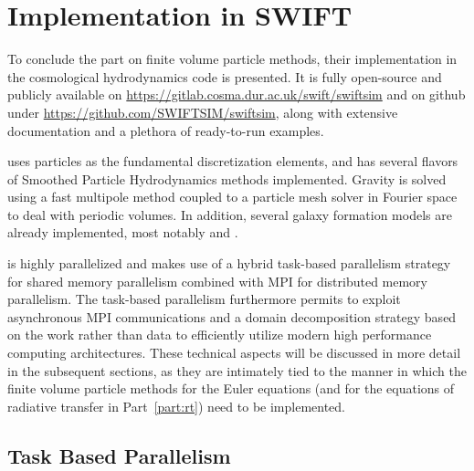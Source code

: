 \chapter{Implementation in SWIFT}\label{chap:meshless-implementation}


To conclude the part on finite volume particle methods, their implementation in the cosmological
hydrodynamics code \swift \citep{schallerSWIFTUsingTaskbased2016,
schallerSWIFTSPHInterdependent2018a} is presented. It is fully open-source and publicly available on \url{https://gitlab.cosma.dur.ac.uk/swift/swiftsim} and on github under
\url{https://github.com/SWIFTSIM/swiftsim}, along with extensive documentation and a plethora of
ready-to-run examples.

\swift uses particles as the fundamental discretization elements, and has several flavors of
Smoothed Particle Hydrodynamics methods implemented. Gravity is solved using a fast multipole method \citep{chengFastAdaptiveMultipole1999, dehnenFastMultipoleMethod2014f} coupled to a particle mesh solver in Fourier space to deal with periodic volumes. In addition, several galaxy formation models are already implemented, most notably  \citep{schayeEAGLEProjectSimulating2015} and  \citep{revazDynamicalChemicalEvolution2012}.

\swift is highly parallelized and makes use of a hybrid task-based parallelism strategy for shared
memory parallelism combined with MPI for distributed memory parallelism. The task-based parallelism
furthermore permits to exploit asynchronous MPI communications and a domain decomposition strategy
based on the work rather than data to efficiently utilize modern high performance computing
architectures. These technical aspects will be discussed in more detail in the subsequent sections,
as they are intimately tied to the manner in which the finite volume particle methods for the Euler
equations (and for the equations of radiative transfer in Part~\ref{part:rt}) need to be
implemented.









\section{Task Based Parallelism}

